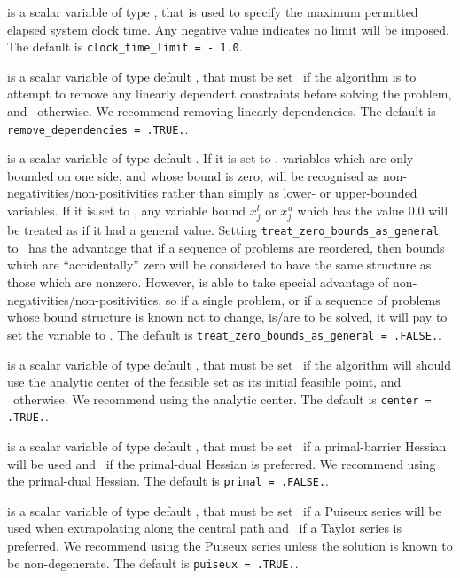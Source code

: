 \begin{description}
 is a scalar variable of type \realdp, 
that is used to specify the maximum permitted elapsed system clock time. 
Any negative value indicates no limit will be imposed. The default is 
{\tt clock\_time\_limit = - 1.0}.

 is a scalar variable of type 
default \logical, that must be set \true\ if the algorithm
is to attempt to remove any linearly dependent constraints before
solving the problem, and \false\ otherwise. 
We recommend removing linearly dependencies.
The default is {\tt remove\_dependencies = .TRUE.}.

 is a scalar variable of type 
default \logical.
If it is set to \false, variables which 
are only bounded on one side, and whose bound is zero,
will be recognised as non-negativities/non-positivities rather than simply as
lower- or upper-bounded variables.
If it is set to \true, any variable bound 
$x_{j}^{l}$ or $x_{j}^{u}$ which has the value 0.0 will be
treated as if it had a general value.
Setting {\tt treat\_zero\_bounds\_as\_general} to \true\ has the advantage
that if a sequence of problems are reordered, then bounds which are
``accidentally'' zero will be considered to have the same structure as
those which are nonzero. However, {\tt \fullpackagename} is
able to take special advantage of non-negativities/non-positivities, so
if a single problem, or if a sequence of problems whose 
bound structure is known not to change, is/are to be solved, 
it will pay to set the variable to \false.
The default is {\tt treat\_zero\_bounds\_as\_general = .FALSE.}.

 is a scalar variable of type default \logical, that 
must be set \true\
if the algorithm will should use the analytic center
of the feasible set as its initial feasible point, 
and \false\ otherwise. 
We recommend using the analytic center.
The default is {\tt center = .TRUE.}.

 is a scalar variable of type default \logical, that 
must be set \true\
if a primal-barrier Hessian will be used
and \false\ if the primal-dual Hessian is preferred.
We recommend using the primal-dual Hessian.
The default is {\tt primal = .FALSE.}.

 is a scalar variable of type default \logical, that 
must be set \true\
if a Puiseux series will be used when extrapolating along the central path
and \false\ if a Taylor series is preferred.
We recommend using the Puiseux series unless the solution is known
to be non-degenerate.
The default is {\tt puiseux = .TRUE.}.


\end{description}
